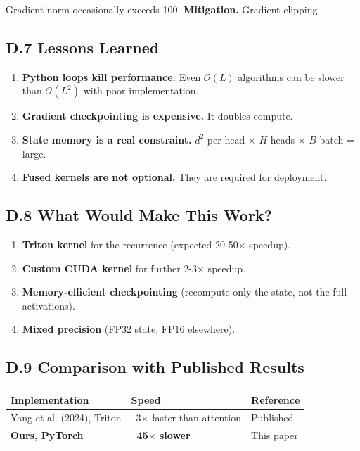 Gradient norm occasionally exceeds 100. \textbf{Mitigation.} Gradient clipping.

\subsection{D.7 Lessons Learned}

\begin{enumerate}
\item \textbf{Python loops kill performance.} Even $\mathcal{O}(L)$ algorithms can
  be slower than $\mathcal{O}(L^2)$ with poor implementation.
\item \textbf{Gradient checkpointing is expensive.} It doubles compute.
\item \textbf{State memory is a real constraint.} $d^2$ per head $\times$ $H$ heads $\times$ $B$
  batch = large.
\item \textbf{Fused kernels are not optional.} They are required for deployment.

\end{enumerate}
\subsection{D.8 What Would Make This Work?}

\begin{enumerate}
\item \textbf{Triton kernel} for the recurrence (expected 20-50$\times$ speedup).
\item \textbf{Custom CUDA kernel} for further 2-3$\times$ speedup.
\item \textbf{Memory-efficient checkpointing} (recompute only the state, not the
  full activations).
\item \textbf{Mixed precision} (FP32 state, FP16 elsewhere).

\end{enumerate}
\subsection{D.9 Comparison with Published Results}

\begin{table}[H]
\centering
\small
\begin{tabular}{lll}
\toprule
\textbf{Implementation} & \textbf{Speed} & \textbf{Reference} \\
\midrule
Yang et al. (2024), Triton & ~3$\times$ faster than attention & Published \\
\textbf{Ours, PyTorch} & \textbf{~45$\times$ slower} & This paper \\
\bottomrule
\end{tabular}
\end{table}

